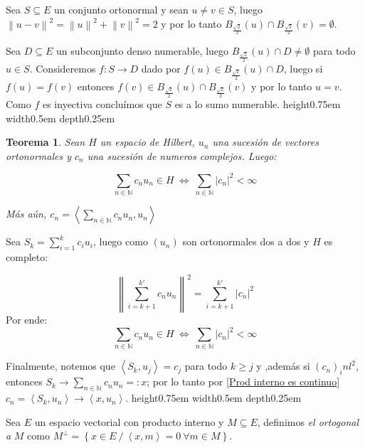 \documentclass[11pt]{article}
\newcommand{\N}{{\mathbb{N}}}
\newcommand{\norm}[1]{\left\lVert#1\right\rVert}
\newcommand{\abs}[1]{\left\lvert#1\right\rvert}
\newcommand{\ip}[1]{\left\langle#1\right\rangle}
\newcommand{\sett}[1]{\left\lbrace#1\right\rbrace}
\newcommand{\Bigsum}[2]{\sum\limits_{#1}{#2}}
\newtheorem{theorem}{Teorema}
\numberwithin{theorem}{subsection}
\newenvironment{proof}[1][Demostraci\'on]{\begin{trivlist}
		\item[\hskip \labelsep {\bfseries #1}]}{\end{trivlist}}
\newenvironment{definition}[1][Definici\'on]{\begin{trivlist}
		\item[\hskip \labelsep {\bfseries #1}]}{\end{trivlist}}
\newcommand{\qed}{\nobreak \ifvmode \relax \else
	\ifdim\lastskip<1.5em \hskip-\lastskip
	\hskip1.5em plus0em minus0.5em \fi \nobreak
	\vrule height0.75em width0.5em depth0.25em\fi}
\begin{document}
\begin{proof}
	Sea $S \subseteq E$ un conjunto ortonormal y sean $u \neq v \in S$, luego $\norm{u-v}^2 = \norm{u}^2 + \norm{v}^2 = 2$ y por lo tanto $B_{\frac{\sqrt{2}}{2}}(u) \cap B_{\frac{\sqrt{2}}{2}}(v) = \emptyset$.
	
	Sea $D \subseteq E$ un subconjunto denso numerable, luego $B_{\frac{\sqrt{2}}{2}}(u) \cap D \neq \emptyset$ para todo $u \in S$. Consideremos $f:S \rightarrow D$ dado por $f(u) \in B_{\frac{\sqrt{2}}{2}}(u) \cap D$, luego si $f(u) = f(v)$ entonces $f(v) \in B_{\frac{\sqrt{2}}{2}}(u) \cap B_{\frac{\sqrt{2}}{2}}(v) $ y por lo tanto $u = v$. Como $f$ es inyectiva conclu\'imos que $S$ es a lo sumo numerable. \qed
	
\end{proof}

\begin{theorem}
	\label{Proyeccion de un elemento en un ortonormal}
	Sean $H$ un espacio de Hilbert, $u_n$ una sucesi\'on de vectores ortonormales  y $c_n$ una sucesi\'on de numeros complejos. Luego:
	
	\begin{equation}
		\Bigsum{n \in \N}{c_nu_n} \in H \ \Longleftrightarrow \ \Bigsum{n \in \N}{\abs{c_n}^2} < \infty
	\end{equation}
	
	M\'as a\'un, $c_n = \ip{\Bigsum{n \in \N}{c_n u_n}, u_n}$
	
\end{theorem}

\begin{proof}
	Sea $S_k = \sum\limits_{i = 1}^{k}{c_i u_i}$, luego como $(u_n)$ son ortonormales dos a dos y $H$ es completo:
	
	\[
			\norm{\sum\limits_{i = k+ 1}^{k'}{c_n u_n}}^2 = \sum\limits_{i = k+ 1}^{k'}{\abs{c_n}^2}
	\]
	Por ende:
	\begin{equation*}
				\Bigsum{n \in \N}{c_nu_n} \in H \ \Longleftrightarrow \ \Bigsum{n \in \N}{\abs{c_n}^2} < \infty
	\end{equation*}
	
	Finalmente, notemos que $\ip{S_k,u_j} = c_j$ para todo $k \geq j$ y ,adem\'as si $(c_n) _in l^2$, entonces $S_k \rightarrow \Bigsum{n \in \N}{c_n u_n}=:x$; por lo tanto por \ref{Prod interno es continuo} $c_n = \ip{S_k,u_n} \rightarrow \ip{x,u_n}$. 
	\qed
	
\end{proof}

\begin{definition}
	Sea $E$ un espacio vectorial con producto interno y $M \subseteq E$, definimos \textit{el ortogonal a } $M$ como $M^{\perp} = \sett{x \in E \ / \ \ip{x,m} = 0 \ \forall m \in M}$.
\end{definition}
\end{document}
